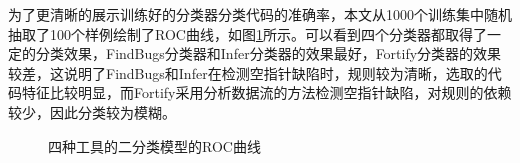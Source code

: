 为了更清晰的展示训练好的分类器分类代码的准确率，本文从1000个训练集中随机抽取了100个样例绘制了ROC曲线，如图\ref{fig:6-4}所示。可以看到四个分类器都取得了一定的分类效果，FindBugs分类器和Infer分类器的效果最好，Fortify分类器的效果较差，这说明了FindBugs和Infer在检测空指针缺陷时，规则较为清晰，选取的代码特征比较明显，而Fortify采用分析数据流的方法检测空指针缺陷，对规则的依赖较少，因此分类较为模糊。

\begin{figure}[h]
	\centering
	\caption{四种工具的二分类模型的ROC曲线}
	\label{fig:6-4}
\end{figure}



